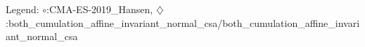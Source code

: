 Legend: {\color{CornflowerBlue}$\circ$}:CMA-ES-2019\_Hansen, {\color{Orange}$\diamondsuit$}:both\_cumulation\_affine\_invariant\_normal\_csa/both\_cumulation\_affine\_invariant\_normal\_csa